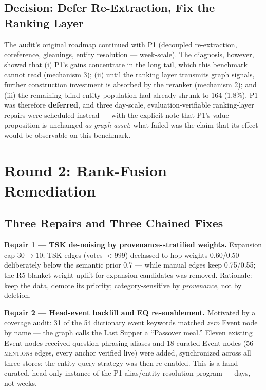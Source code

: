 \subsection{Decision: Defer Re-Extraction, Fix the Ranking Layer}

The audit's original roadmap continued with P1 (decoupled re-extraction,
coreference, gleanings, entity resolution --- week-scale). The
diagnosis, however, showed that (i) P1's gains concentrate in the long
tail, which this benchmark cannot read (mechanism 3); (ii) until the
ranking layer transmits graph signals, further construction investment
is absorbed by the reranker (mechanism 2); and (iii) the remaining
blind-entity population had already shrunk to 164 (1.8\%). P1 was
therefore \textbf{deferred}, and three day-scale, evaluation-verifiable
ranking-layer repairs were scheduled instead --- with the explicit note
that P1's value proposition is unchanged \emph{as graph asset}; what
failed was the claim that its effect would be observable on this
benchmark.

\section{Round 2: Rank-Fusion Remediation}
\label{sec:fusion}

\subsection{Three Repairs and Three Chained Fixes}

\textbf{Repair 1 --- TSK de-noising by provenance-stratified weights.}
Expansion cap $30 \to 10$; TSK edges (votes $<999$) declassed to hop
weights 0.60/0.50 --- deliberately below the semantic prior 0.7 ---
while manual edges keep 0.75/0.55; the R5 blanket weight uplift for
expansion candidates was removed. Rationale: keep the data, demote its
priority; category-sensitive by \emph{provenance}, not by deletion.

\textbf{Repair 2 --- Head-event backfill and EQ re-enablement.}
Motivated by a coverage audit: 31 of the 54 dictionary event keywords
matched \emph{zero} Event node by name --- the graph calls the Last
Supper a ``Passover meal.'' Eleven existing Event nodes received
question-phrasing aliases and 18 curated Event nodes (56 \textsc{mentions}
edges, every anchor verified live) were added, synchronized across all
three stores; the entity-query strategy was then re-enabled. This is a
hand-curated, head-only instance of the P1 alias/entity-resolution
program --- days, not weeks.


